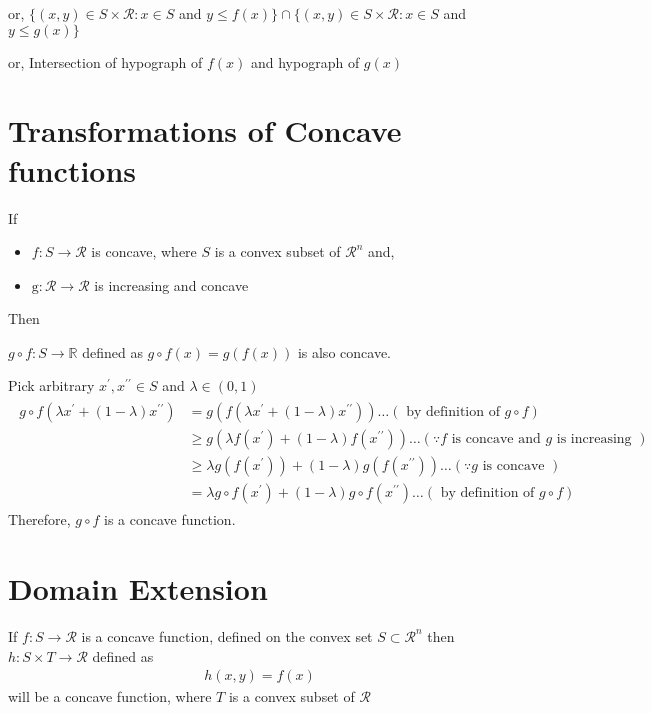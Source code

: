 \documentclass[12pt,a4paper]{article}
\begin{document}
or, \(\{(x, y) \in S \times \mathcal{R}: x \in S\) and \(y \leq f(x)\} \cap\{(x, y) \in S \times \mathcal{R}: x \in S\) and \(y \leq g(x)\}\)

or, Intersection of hypograph of \(f(x)\) and hypograph of \(g(x)\)

\section{Transformations of Concave functions}
If
\begin{itemize}
    \item \(f: S \rightarrow \mathcal{R}\) is concave, where \(S\) is a convex subset of \(\mathcal{R}^n\) and,
    \item \(\mathrm{g}: \mathcal{R} \rightarrow \mathcal{R}\) is increasing and concave
\end{itemize}
Then

\(g \circ f: S \rightarrow \mathbb{R}\) defined as \(g \circ f(x)=g(f(x))\) is also concave.

Pick arbitrary \(x^{\prime}, x^{\prime \prime} \in S\) and \(\lambda \in(0,1)\)
\begin{align*}
\begin{aligned}
g \circ f\left(\lambda x^{\prime}+(1-\lambda) x^{\prime \prime}\right) & =g\left(f\left(\lambda x^{\prime}+(1-\lambda) x^{\prime \prime}\right)\right) \ldots(\text { by definition of } g \circ f) \\
& \geq g\left(\lambda f\left(x^{\prime}\right)+(1-\lambda) f\left(x^{\prime \prime}\right)\right) \ldots(\because f \text { is concave and } g \text { is increasing }) \\
& \geq \lambda g\left(f\left(x^{\prime}\right)\right)+(1-\lambda) g\left(f\left(x^{\prime \prime}\right)\right) \ldots(\because g \text { is concave }) \\
& =\lambda g \circ f\left(x^{\prime}\right)+(1-\lambda) g \circ f\left(x^{\prime \prime}\right) \ldots(\text { by definition of } g \circ f)
\end{aligned}
\end{align*}
Therefore, \(g \circ f\) is a concave function.

\section{Domain Extension}
If \(f: S \rightarrow \mathcal{R}\) is a concave function, defined on the convex set \(S \subset \mathcal{R}^n\) then \(h: S \times T \rightarrow \mathcal{R}\) defined as
\begin{align*}
h(x, y)=f(x)
\end{align*}
will be a concave function, where \(T\) is a convex subset of \(\mathcal{R}\)
\end{document}
